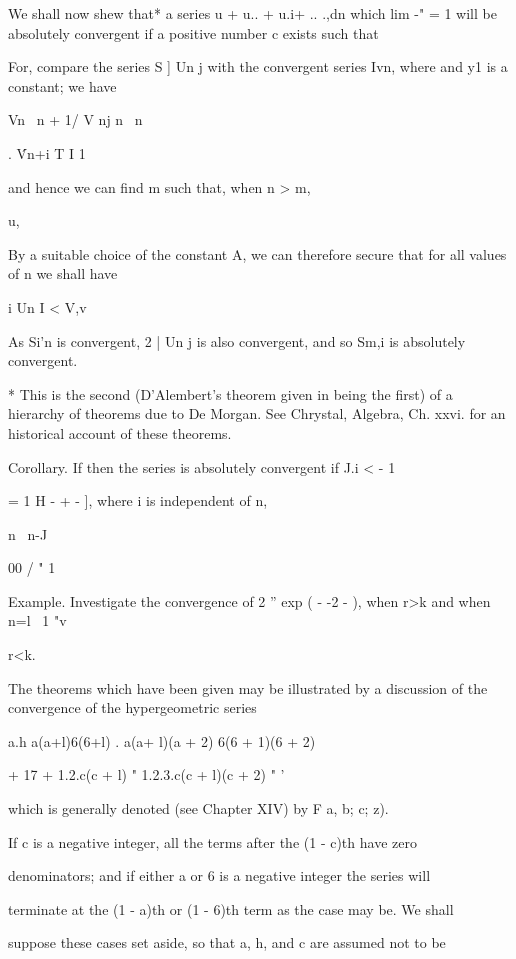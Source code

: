 We shall now shew that* a series u + u.. + u.i+ .. .,dn which lim -" =
1 will be absolutely convergent if a positive number c exists such
that

For, compare the series S ] Un j with the convergent series Ivn, where
and y1 is a constant; we have

Vn \ n + 1/ V nj n \ n

. \'Vn+i T I 1

and hence we can find m such that, when n > m,

u,

By a suitable choice of the constant A, we can therefore secure that
for all values of n we shall have

i Un I < V,v

As Si'n is convergent, 2 | Un j is also convergent, and so Sm,i is
absolutely convergent.

* This is the second (D'Alembert's theorem given in  being the
first) of a hierarchy of theorems due to De Morgan. See Chrystal,
Algebra, Ch. xxvi. for an historical account of these theorems.

%
%


Corollary. If then the series is absolutely convergent if J.i < - 1

= 1 H - + - ], where i is independent of n,

n \ n-J

00 / " 1 \

Example. Investigate the convergence of 2 '' exp ( - -2 - ), when r>k
and when n=l \ 1 "v

r<k.


The theorems which have been given may be illustrated by a discussion
of the convergence of the hypergeometric series

  a.h a(a+l)6(6+l) . a(a+ l)(a + 2) 6(6 + 1)(6 + 2)

  + 17 + 1.2.c(c + l) " 1.2.3.c(c + l)(c + 2) " '

which is generally denoted (see Chapter XIV) by F a, b; c; z).

If c is a negative integer, all the terms after the (1 - c)th have
zero

denominators; and if either a or 6 is a negative integer the series
will

terminate at the (1 - a)th or (1 - 6)th term as the case may be. We
shall

suppose these cases set aside, so that a, h, and c are assumed not to
be

